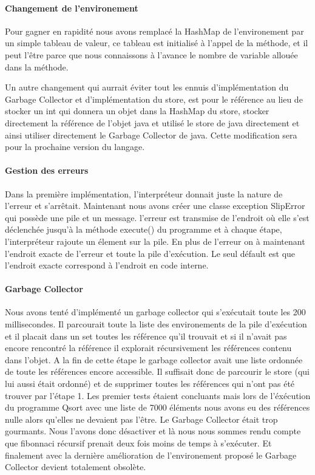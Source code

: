 \paragraph{Changement de l'environement}
Pour gagner en rapidité nous avons remplacé la HashMap de l'environement par un simple tableau de valeur, ce tableau est initialisé à l'appel de la méthode, et il peut l'être parce que nous connaissons à l'avance le nombre de variable allouée dans la méthode.

Un autre changement qui aurrait éviter tout les ennuis d'implémentation du Garbage Collector et d'implémentation du store, est pour le référence au lieu de stocker un int qui donnera un objet dans la HashMap du store, stocker directement la référence de l'objet java et utilisé le store de java directement et ainsi utiliser directement le Garbage Collector de java. Cette modification sera pour la prochaine version du langage. 

\paragraph{Gestion des erreurs}
Dans la première implémentation, l'interpréteur donnait juste la nature de l'erreur et s'arrêtait. Maintenant nous avons créer une classe exception SlipError qui possède une pile et un message. l'erreur est transmise de l'endroit où elle s'est déclenchée jusqu'à la méthode execute() du programme et à chaque étape, l'interpréteur rajoute un élement sur la pile. En plus de l'erreur on à maintenant l'endroit exacte de l'erreur et toute la pile d'exécution. Le seul défault est que l'endroit exacte correspond à l'endroit en code interne. 

\paragraph{Garbage Collector}
Nous avons tenté d'implémenté un garbage collector qui s'exécutait toute les 200 millisecondes. Il parcourait toute la liste des environements de la pile d'exécution et il placait dans un set toutes les référence qu'il trouvait et si il n'avait pas encore rencontré la référence il explorait récursivement les références contenu dans l'objet. A la fin de cette étape le garbage collector avait une liste ordonnée de toute les références encore accessible. Il suffisait donc de parcourir le store (qui lui aussi était ordonné) et de supprimer toutes les références qui n'ont pas été trouver par l'étape 1.
Les premier tests étaient concluants mais lors de l'éxécution du programme Qsort avec une liste de 7000 éléments nous avons eu des références nulle alors qu'elles ne devaient pas l'être. Le Garbage Collector était trop gourmants. Nous l'avons donc désactiver et là nous nous sommes rendu compte que fibonnaci récursif prenait deux fois moins de temps à s'exécuter. Et finalement avec la dernière amélioration de l'environement proposé le Garbage Collector devient totalement obsolète.  

